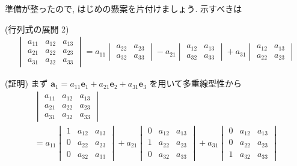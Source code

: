\documentclass[openany, a4paper, oneside]{jsbook}
\begin{document}
準備が整ったので, はじめの懸案を片付けましょう. 示すべきは
\begin{thm}(行列式の展開 2)
\begin{align}
    \begin{vmatrix} a_{11} & a_{12} & a_{13} \\
                    a_{21} & a_{22} & a_{23} \\
                    a_{31} & a_{32} & a_{33}
    \end{vmatrix}
    =
    a_{11}   \begin{vmatrix} a_{22} & a_{23} \\
                        a_{32} & a_{33}
            \end{vmatrix}
    -a_{21} \begin{vmatrix} a_{12} & a_{13} \\
                        a_{32} & a_{33}
            \end{vmatrix}
    +a_{31} \begin{vmatrix} a_{12} & a_{13} \\
                        a_{22} & a_{23}
            \end{vmatrix}
\end{align}
\end{thm}
(証明) まず $\bm{a}_{1} = a_{11}\bm{e}_{1} + a_{21}\bm{e}_{2} + a_{31}\bm{e}_{3}$ を用いて多重線型性から
\begin{gather}
    \begin{vmatrix} a_{11} & a_{12} & a_{13} \\
                    a_{21} & a_{22} & a_{23} \\
                    a_{31} & a_{32} & a_{33}
    \end{vmatrix} \\
    =
    a_{11}\begin{vmatrix} 1 & a_{12} & a_{13} \\
                          0 & a_{22} & a_{23} \\
                          0 & a_{32} & a_{33}
          \end{vmatrix}
    +a_{21}\begin{vmatrix} 0 & a_{12} & a_{13} \\
                            1 & a_{22} & a_{23} \\
                            0 & a_{32} & a_{33}
            \end{vmatrix}
    +a_{31}\begin{vmatrix} 0 & a_{12} & a_{13} \\
                            0 & a_{22} & a_{23} \\
                            1 & a_{32} & a_{33}
            \end{vmatrix}
\end{gather}
\end{document}
